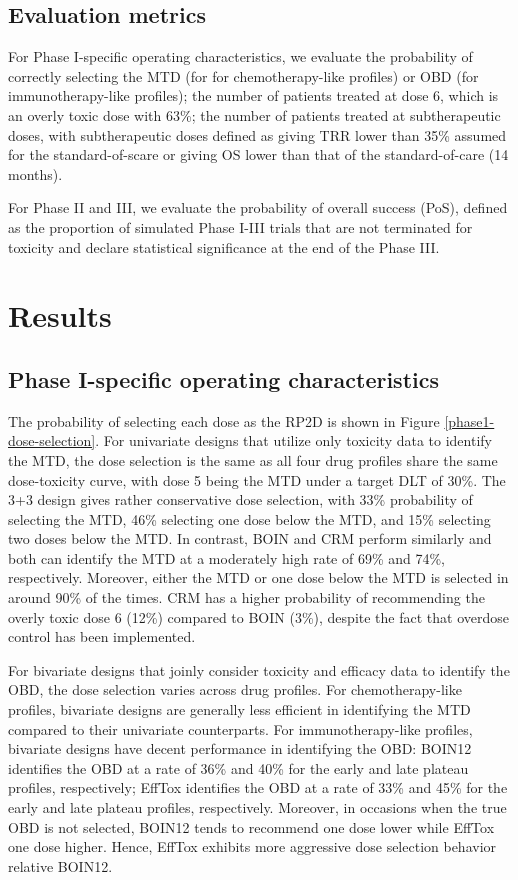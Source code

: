 \documentclass[11pt]{article}
\begin{document}
\subsection{Evaluation metrics}
For Phase I-specific operating characteristics, we evaluate the probability of correctly selecting the MTD (for for chemotherapy-like profiles) or OBD (for immunotherapy-like profiles); the number of patients treated at dose 6, which is an overly toxic dose with 63\%; the number of patients treated at subtherapeutic doses, with subtherapeutic doses defined as giving TRR lower than 35\% assumed for the standard-of-scare or giving OS lower than that of the standard-of-care (14 months).

For Phase II and III, we evaluate the probability of overall success (PoS), defined as the proportion of simulated Phase I-III trials that are not terminated for toxicity and declare statistical significance at the end of the Phase III.
\section{Results}
\subsection{Phase I-specific operating characteristics}
The probability of selecting each dose as the RP2D is shown in Figure \ref{phase1-dose-selection}. For univariate designs that utilize only toxicity data to identify the MTD, the dose selection is the same as all four drug profiles share the same dose-toxicity curve, with dose 5 being the MTD under a target DLT of 30\%. The 3+3 design gives rather conservative dose selection, with 33\% probability of selecting the MTD, 46\% selecting one dose below the MTD, and 15\% selecting two doses below the MTD. In contrast, BOIN and CRM perform similarly and both can identify the MTD at a moderately high rate of 69\% and 74\%, respectively. Moreover, either the MTD or one dose below the MTD is selected in around 90\% of the times. CRM has a higher probability of recommending the overly toxic dose 6 (12\%) compared to BOIN (3\%), despite the fact that overdose control has been implemented. 

For bivariate designs that joinly consider toxicity and efficacy data to identify the OBD, the dose selection varies across drug profiles. For chemotherapy-like profiles, bivariate designs are generally less efficient in identifying the MTD compared to their univariate counterparts. For immunotherapy-like profiles, bivariate designs have decent performance in identifying the OBD: BOIN12 identifies the OBD at a rate of 36\% and 40\% for the early and late plateau profiles, respectively; EffTox identifies the OBD at a rate of 33\% and 45\% for the early and late plateau profiles, respectively. Moreover, in occasions when the true OBD is not selected, BOIN12 tends to recommend one dose lower while EffTox one dose higher. Hence, EffTox exhibits more aggressive dose selection behavior relative BOIN12.
\end{document}
